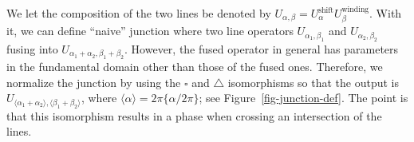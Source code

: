 \documentclass[
  letterpaper,
  DIV=11,
  numbers=noendperiod]{scrreport}
\begin{document}
We let the composition of the two lines be denoted by
\(U_{\alpha,\beta} = U^\text{shift}_\alpha U^\text{winding}_\beta\).
With it, we can define ``naive'' junction where two line operators
\(U_{\alpha_1,\beta_1}\) and \(U_{\alpha_2,\beta_2}\) fusing into
\(U_{\alpha_1+\alpha_2,\beta_1+\beta_2}\). However, the fused operator
in general has parameters in the fundamental domain other than those of
the fused ones. Therefore, we normalize the junction by using the
\(\square\) and \(\triangle\) isomorphisms so that the output is
\(U_{\langle \alpha_1+\alpha_2\rangle, \langle \beta_1+\beta_2\rangle}\),
where \(\langle \alpha \rangle = 2\pi\{\alpha/2\pi\}\); see
Figure~\ref{fig-junction-def}. The point is that this isomorphism
results in a phase when crossing an intersection of the lines.

\begin{figure}

\begin{minipage}[t]{0.35\linewidth}

{\centering 


}

\end{minipage}%
%
\begin{minipage}[t]{0.05\linewidth}

{\centering 

~

}

\end{minipage}%
%
\begin{minipage}[t]{0.60\linewidth}

{\centering 

}
\end{minipage}
\end{figure}
\end{document}
